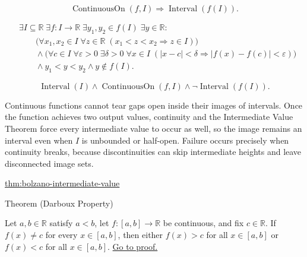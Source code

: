 \begin{remark*}
\[
\operatorname{ContinuousOn}(f,I)
\Longrightarrow
\operatorname{Interval}(f(I)).
\]
\end{remark*}

\begin{remark*}
\[
\begin{aligned}
&\exists I\subseteq\mathbb{R}\;\exists f:I\to\mathbb{R}\;
\exists y_1,y_2\in f(I)\;\exists y\in\mathbb{R}:\\
&\qquad
\bigl(\forall x_1,x_2\in I\;\forall z\in\mathbb{R}\;(x_1<z<x_2\Rightarrow z\in I)\bigr)\\
&\qquad\land
\bigl(\forall c\in I\;\forall \varepsilon>0\;\exists \delta>0\;\forall x\in I\;
(|x-c|<\delta\Rightarrow |f(x)-f(c)|<\varepsilon)\bigr)\\
&\qquad\land
y_1<y<y_2
\land
y\notin f(I).
\end{aligned}
\]
\end{remark*}

\begin{remark*}
\[
\operatorname{Interval}(I)\land\operatorname{ContinuousOn}(f,I)
\land\neg\operatorname{Interval}(f(I)).
\]
\end{remark*}

\begin{remark*}[Interpretation]
Continuous functions cannot tear gaps open inside their images of intervals. Once the function achieves two output values, continuity and the Intermediate Value Theorem force every intermediate value to occur as well, so the image remains an interval even when $I$ is unbounded or half-open. Failure occurs precisely when continuity breaks, because discontinuities can skip intermediate heights and leave disconnected image sets.
\end{remark*}

\begin{dependencies}
\hyperref[thm:bolzano-intermediate-value]{thm:bolzano-intermediate-value}
\end{dependencies}


\begin{theorembox}{Theorem (Darboux Property)}
\begin{theorem}
\label{thm:darboux-property}
Let $a,b\in\mathbb{R}$ satisfy $a<b$, let $f:[a,b]\to\mathbb{R}$ be continuous, and fix $c\in\mathbb{R}$. If $f(x)\neq c$ for every $x\in[a,b]$, then either $f(x)>c$ for all $x\in[a,b]$ or $f(x)<c$ for all $x\in[a,b]$.
\hyperref[prf:darboux-property]{Go to proof.}
\end{theorem}
\end{theorembox}

